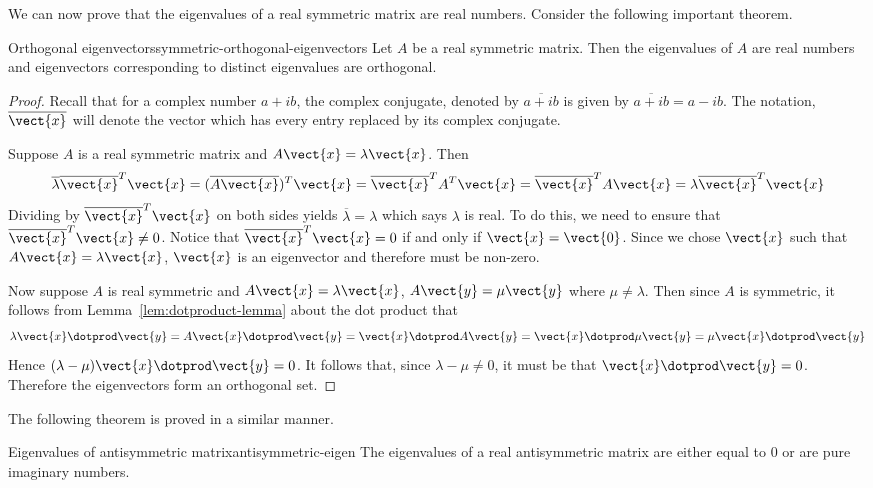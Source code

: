 We can now prove that the eigenvalues of a real symmetric matrix are real numbers.  Consider the following important theorem.

\begin{theorem}{Orthogonal eigenvectors}{symmetric-orthogonal-eigenvectors}
Let $A$ be a real symmetric matrix. Then the eigenvalues of $A$ are real numbers and eigenvectors corresponding to distinct eigenvalues are orthogonal.
\end{theorem}

\begin{proof}
Recall that for a complex number $a+ib$, the complex conjugate, denoted by $
\overline{a+ib}$ is given by $\overline{a+ib}=a-ib$. The
notation, $\overline{\vect{x}}$ will denote the vector which has every
entry replaced by its complex conjugate.

Suppose $A$ is a real symmetric matrix and $A\vect{x}=\lambda \vect{x}$.
Then
\begin{equation*}
\overline{\lambda }\overline{\vect{x}}^{T}\vect{x}=(\overline{A
\vect{x}}) ^{T}\vect{x}=\overline{\vect{x}}^{T}A^{T}\vect{x}=
\overline{\vect{x}}^{T}A\vect{x}=\lambda \overline{\vect{x}}^{T}
\vect{x}
\end{equation*}
Dividing by $\overline{\vect{x}}^{T}\vect{x}$ on both sides yields $
\overline{\lambda }=\lambda $ which says $\lambda $ is real. To do this, we need to ensure that $\overline{\vect{x}}^{T}\vect{x} \neq 0$. Notice that $\overline{\vect{x}}^{T}\vect{x} = 0$ if and only if $\vect{x} = \vect{0}$. Since we chose $\vect{x}$ such that $A\vect{x} = \lambda \vect{x}$, $\vect{x}$ is an eigenvector and therefore must be non-zero.

Now suppose $A$ is real symmetric and $A\vect{x}=\lambda \vect{x}$, $A
\vect{y}=\mu \vect{y}$ where $\mu \neq \lambda$. Then since $A$
is symmetric, it follows from Lemma~\ref{lem:dotproduct-lemma} about the dot product that
\begin{equation*}
\lambda \vect{x}\dotprod \vect{y}=A\vect{x}\dotprod \vect{y}=\vect{x}\dotprod A\vect{y}=\vect{x}\dotprod \mu \vect{y}=\mu \vect{x}\dotprod \vect{y}
\end{equation*}
Hence $(\lambda -\mu) \vect{x}\dotprod \vect{y}=0$. It follows that,
since $\lambda -\mu \neq 0$, it must be that $\vect{x}\dotprod \vect{y}=0$. Therefore the eigenvectors form an orthogonal set.
\end{proof}

The following theorem is proved in a similar manner.

\begin{theorem}{Eigenvalues of antisymmetric matrix}{antisymmetric-eigen}
The eigenvalues of a real antisymmetric matrix are either equal to $0$ or are pure imaginary numbers.
\end{theorem}

